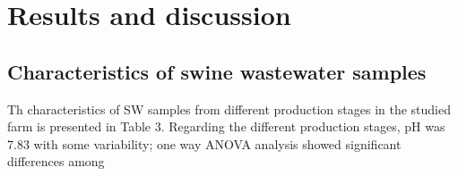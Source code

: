 \section{Results and discussion}
\subsection{Characteristics of swine wastewater samples}
Th characteristics of SW samples from different production stages in the studied farm is presented in Table 3. Regarding the different production stages, pH was 7.83 with some variability; one way ANOVA analysis showed significant differences among 